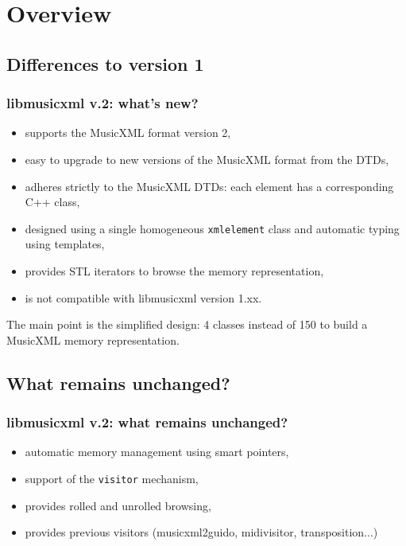 \documentclass{paper}
\begin{document}
\section{Overview}
\subsection{Differences to version 1}
\begin{frame}
	\frametitle{libmusicxml v.2: what's new?}
	\begin{itemize}
		\item supports the MusicXML format version 2,
		\item easy to upgrade to new versions of the MusicXML format from the DTDs,
		\item adheres strictly to the MusicXML DTDs: each element has a corresponding C++ class,
		\item designed using a single homogeneous \texttt{xmlelement} class and automatic
		typing using templates,
		\item provides STL iterators to browse the memory representation,
		\item is \alert{not compatible} with libmusicxml version 1.xx.
	\end{itemize}
	\begin{block}{}
	The main point is the simplified design: 4 classes instead of 150 to build a MusicXML
	memory representation.
	\end{block}
\end{frame}

\subsection{What remains unchanged?}
\begin{frame}
	\frametitle{libmusicxml v.2: what remains unchanged?}
	\begin{itemize}
		\item automatic memory management using smart pointers,
		\item support of the \texttt{visitor} mechanism,
		\item provides rolled and unrolled browsing,
		\item provides previous visitors (musicxml2guido, midivisitor, transposition...)
	\end{itemize}
\end{frame}
\end{document}
